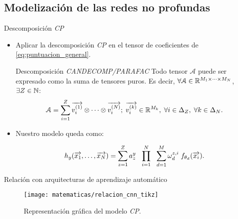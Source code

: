\subsection{Modelización de las redes no profundas}
\begin{frame}{Descomposición \textit{CP}}
	\begin{itemize}
		\item Aplicar la descomposición \textit{CP} en el tensor de coeficientes de \eqref{eq:puntuacion_general}.

		      \begin{block}{Descomposición \textit{CANDECOMP/PARAFAC}}
			      Todo tensor $\mathcal{A}$ puede ser expresado como la suma de tensores puros. Es decir, $\forall \mathcal{A} \in \mathbb{R}^{M_1 \times \cdots \times M_N}$, $\exists Z \in \mathbb{N}$:
			      \begin{equation}
				      \mathcal{A} = \sum_{i = 1}^Z \overrightarrow{v_i^{(1)}} \otimes \cdots \otimes \overrightarrow{v_i^{(N)}};
				      \; \overrightarrow{v_i^{(k)}} \in \mathbb{R}^{M_k},
				      \; \forall i \in \Delta_{Z},
				      \; \forall k \in \Delta_{N}.
			      \end{equation}
		      \end{block}

		\item Nuestro modelo queda como:

		      \begin{equation} \label{eq:cp_model}
			      h_y(\overrightarrow{x_1}, \ldots, \overrightarrow{x_N}) =  \sum_{z = 1}^Z a_z^y \ \  \prod_{i = 1}^N \ \  \sum_{d = 1}^{M} \omega^{z, i}_d \; f_{\theta_{d}}(\overrightarrow{x_i}).
		      \end{equation}

	\end{itemize}
\end{frame}

\begin{frame}{Relación con arquitecturas de aprendizaje automático}
	\begin{figure}
		\centering
		\texttt{[image: matematicas/relacion\_cnn\_tikz]}
		\caption{Representación gráfica del modelo \textit{CP}.}
	\end{figure}

\end{frame}


